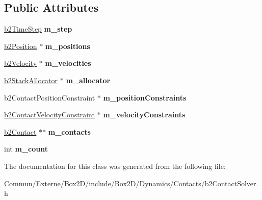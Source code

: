 \subsection*{Public Attributes}
\begin{DoxyCompactItemize}
\item 
\hyperlink{structb2_time_step}{b2\+Time\+Step} {\bfseries m\+\_\+step}\hypertarget{classb2_contact_solver_aac78600ba5fd3249bac20678cbc9f101}{}\label{classb2_contact_solver_aac78600ba5fd3249bac20678cbc9f101}

\item 
\hyperlink{structb2_position}{b2\+Position} $\ast$ {\bfseries m\+\_\+positions}\hypertarget{classb2_contact_solver_a39b973c8311e522f44cda9053dcea5a8}{}\label{classb2_contact_solver_a39b973c8311e522f44cda9053dcea5a8}

\item 
\hyperlink{structb2_velocity}{b2\+Velocity} $\ast$ {\bfseries m\+\_\+velocities}\hypertarget{classb2_contact_solver_aae6dae9341dbbd780e7b3ec6b1b332f9}{}\label{classb2_contact_solver_aae6dae9341dbbd780e7b3ec6b1b332f9}

\item 
\hyperlink{classb2_stack_allocator}{b2\+Stack\+Allocator} $\ast$ {\bfseries m\+\_\+allocator}\hypertarget{classb2_contact_solver_a6a2c9f5470a469e50d7f33f8d9095abe}{}\label{classb2_contact_solver_a6a2c9f5470a469e50d7f33f8d9095abe}

\item 
b2\+Contact\+Position\+Constraint $\ast$ {\bfseries m\+\_\+position\+Constraints}\hypertarget{classb2_contact_solver_ac0f4106f7cf67d185a7a4f3fd5a4e4ce}{}\label{classb2_contact_solver_ac0f4106f7cf67d185a7a4f3fd5a4e4ce}

\item 
\hyperlink{structb2_contact_velocity_constraint}{b2\+Contact\+Velocity\+Constraint} $\ast$ {\bfseries m\+\_\+velocity\+Constraints}\hypertarget{classb2_contact_solver_a616319ffa7ceb509b8189f07a070f7c7}{}\label{classb2_contact_solver_a616319ffa7ceb509b8189f07a070f7c7}

\item 
\hyperlink{classb2_contact}{b2\+Contact} $\ast$$\ast$ {\bfseries m\+\_\+contacts}\hypertarget{classb2_contact_solver_aa1c7370d1d2681f9d49a494f9b0a38c6}{}\label{classb2_contact_solver_aa1c7370d1d2681f9d49a494f9b0a38c6}

\item 
int {\bfseries m\+\_\+count}\hypertarget{classb2_contact_solver_ab5b74c0fadf0d5d8997700b5ff91ea91}{}\label{classb2_contact_solver_ab5b74c0fadf0d5d8997700b5ff91ea91}

\end{DoxyCompactItemize}


The documentation for this class was generated from the following file\+:\begin{DoxyCompactItemize}
\item 
Commun/\+Externe/\+Box2\+D/include/\+Box2\+D/\+Dynamics/\+Contacts/b2\+Contact\+Solver.\+h\end{DoxyCompactItemize}
